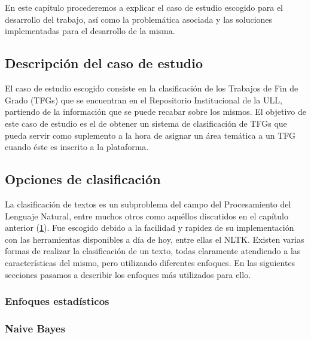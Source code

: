 \chapter{\ChapterTwo{}} \label{amigo}

En este capítulo procederemos a explicar el caso de estudio escogido para el desarrollo del trabajo, así como la problemática asociada y las soluciones implementadas para el desarrollo de la misma.

\section{Descripción del caso de estudio}

El caso de estudio escogido consiste en la clasificación de los Trabajos de Fin de Grado (TFGs) que se encuentran en el Repositorio Institucional de la ULL, partiendo de la información que se puede recabar sobre los mismos.
%
El objetivo de este caso de estudio es el de obtener un sistema de clasificación de TFGs que pueda servir como suplemento a la hora de asignar un área temática a un TFG cuando éste es inscrito a la plataforma.

\section{Opciones de clasificación}

La clasificación de textos es un subproblema del campo del Procesamiento del Lenguaje Natural, entre muchos otros como aquéllos discutidos en el capítulo anterior (\ref{amigo}).
%
Fue escogido debido a la facilidad y rapidez de su implementación con las herramientas disponibles a día de hoy, entre ellas el NLTK.
%
Existen varias formas de realizar la clasificación de un texto, todas claramente atendiendo a las características del mismo, pero utilizando diferentes enfoques.
%
En las siguientes secciones pasamos a describir los enfoques más utilizados para ello.

\subsection{Enfoques estadísticos}



\subsection{Naive Bayes}

